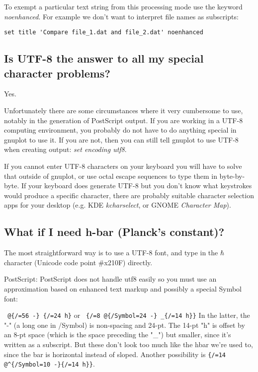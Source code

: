 \documentclass[a4paper,11pt]{article}
\begin{document}
To exempt a particular text string from this processing mode use the keyword
{\em noenhanced}.  For example we don't want to interpret file names as subscripts:
\small
\begin{verbatim}
set title 'Compare file_1.dat and file_2.dat' noenhanced
\end{verbatim}
\normalsize

\subsection{Is UTF-8 the answer to all my special character problems?}

Yes.

Unfortunately there are some circumstances where it very cumbersome to use,
notably in the generation of PostScript output.
If you are working in a UTF-8 computing environment, you probably do not have to
do anything special in gnuplot to use it.
If you are not, then you can still tell gnuplot to use UTF-8 when creating output:
{\em set encoding utf8}.

If you cannot enter UTF-8 characters on your
keyboard you will have to solve that outside of gnuplot, or use octal escape
sequences to type them in byte-by-byte.  If your keyboard does generate UTF-8
but you don't know what keystrokes would produce a specific character, there
are probably suitable character selection apps for your desktop
(e.g. KDE {\em kcharselect}, or GNOME {\em Character Map}).

\subsection{What if I need h-bar (Planck's constant)?}

The most straightforward way is to use a UTF-8 font, and type in the
$\hbar$ character (Unicode code point \#x210F) directly.

PostScript: PostScript does not handle utf8 easily so you must use an
approximation based on enhanced text markup and possibly a special
Symbol font:

\verb+ @{/=56 -} {/=24 h}+ or
\verb+ {/=8 @{/Symbol=24 -} _{/=14 h}}+
In the latter, the "-" (a long one in /Symbol) is non-spacing and 24-pt.
The 14-pt "h" is offset by an 8-pt space (which is the space preceding
the "\_") but smaller, since it's written as a subscript.
But these don't look too much like the hbar we're used to, since the bar
is horizontal instead of sloped.
Another possibility is \verb+{/=14 @^{/Symbol=10 -}{/=14 h}}+.
\end{document}

